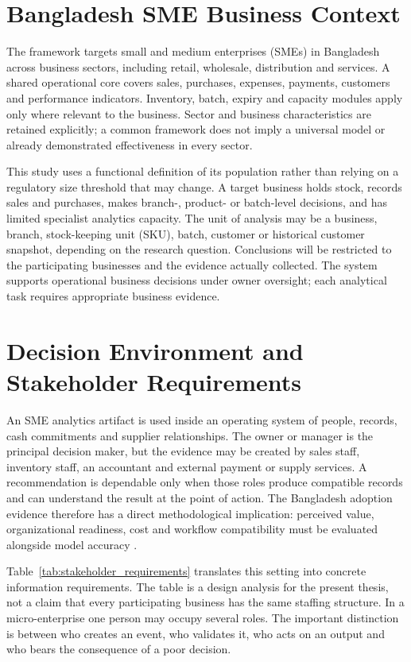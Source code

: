 \section{Bangladesh SME Business Context}

The framework targets small and medium enterprises (SMEs) in Bangladesh
across business sectors, including retail, wholesale, distribution and services.
A shared operational core covers sales, purchases, expenses, payments, customers
and performance indicators. Inventory, batch, expiry and capacity modules apply
only where relevant to the business. Sector and business characteristics are
retained explicitly; a common framework does not imply a universal model or
already demonstrated effectiveness in every sector.

This study uses a functional definition of its population rather than relying
on a regulatory size threshold that may change. A target business holds stock,
records sales and purchases, makes branch-, product- or batch-level decisions,
and has limited specialist analytics capacity. The unit of analysis may be a
business, branch, stock-keeping unit (SKU), batch, customer or historical
customer snapshot, depending on the research question. Conclusions will be
restricted to the participating businesses and the evidence actually
collected. The system supports operational business decisions under owner
oversight; each analytical task requires appropriate business evidence.

\section{Decision Environment and Stakeholder Requirements}

An SME analytics artifact is used inside an operating system of people,
records, cash commitments and supplier relationships. The owner or manager is
the principal decision maker, but the evidence may be created by sales staff,
inventory staff, an accountant and external payment or supply services. A
recommendation is dependable only when those roles produce compatible records
and can understand the result at the point of action. The Bangladesh adoption
evidence therefore has a direct methodological implication: perceived value,
organizational readiness, cost and workflow compatibility must be evaluated
alongside model accuracy \cite{hoque2016ict,shahadat2023digital}.

Table~\ref{tab:stakeholder_requirements} translates this setting into concrete
information requirements. The table is a design analysis for the present
thesis, not a claim that every participating business has the same staffing
structure. In a micro-enterprise one person may occupy several roles. The
important distinction is between who creates an event, who validates it, who
acts on an output and who bears the consequence of a poor decision.

